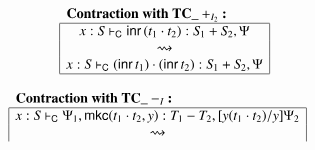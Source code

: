 \documentclass{lmcs}
\newcommand{\DualLNLLogicnt}[1]{\mathit{#1}}
\newcommand{\DualLNLLogicmv}[1]{\mathit{#1}}
\newcommand{\DualLNLLogicsym}[1]{#1}
\newcommand{\DualLNLLogicdrulename}[1]{\textsc{#1}}
\newcommand{\DualLNLLogicdruleTCXXdITwoName}[0]{\DualLNLLogicdrulename{TC\_dI2}}
\newcommand{\DualLNLLogicdruleTCXXsubIName}[0]{\DualLNLLogicdrulename{TC\_subI}}
\renewcommand{\DualLNLLogicdrulename}[1]{#1}
\renewcommand{\DualLNLLogicdruleTCXXdITwoName}{\text{TC\_}+_{I_2}}
\renewcommand{\DualLNLLogicdruleTCXXsubIName}{\text{TC\_}-_I}
\begin{document}
\begin{figure}
\begin{mdframed}
\begin{center}
\begin{math}
\begin{array}{c}
\begin{array}{cc}
\begin{array}{|c|}
        \hline
        \end{array}
        &
        \begin{array}{|c|}
        \multicolumn{1}{l}{\textbf{\textbf{Contraction with $\DualLNLLogicdruleTCXXdITwoName{}$}:}}\\
        \hline
         \DualLNLLogicmv{x}  :  \DualLNLLogicnt{S}  \vdash_{\mathsf{C} }   \mathsf{inr}\, \DualLNLLogicsym{(}   \DualLNLLogicnt{t_{{\mathrm{1}}}}  \cdot  \DualLNLLogicnt{t_{{\mathrm{2}}}}   \DualLNLLogicsym{)}   \DualLNLLogicsym{:}   \DualLNLLogicnt{S_{{\mathrm{1}}}}  +  \DualLNLLogicnt{S_{{\mathrm{2}}}}   \DualLNLLogicsym{,}  \Psi \\
        \rightsquigarrow\\
         \DualLNLLogicmv{x}  :  \DualLNLLogicnt{S}  \vdash_{\mathsf{C} }   \DualLNLLogicsym{(}   \mathsf{inr}\, \DualLNLLogicnt{t_{{\mathrm{1}}}}   \DualLNLLogicsym{)}  \cdot  \DualLNLLogicsym{(}   \mathsf{inr}\, \DualLNLLogicnt{t_{{\mathrm{2}}}}   \DualLNLLogicsym{)}   \DualLNLLogicsym{:}   \DualLNLLogicnt{S_{{\mathrm{1}}}}  +  \DualLNLLogicnt{S_{{\mathrm{2}}}}   \DualLNLLogicsym{,}  \Psi \\
        \hline
      \end{array}
      \end{array}\\
      \\
      \begin{array}{|c|}
        \multicolumn{1}{l}{\textbf{\textbf{Contraction with $\DualLNLLogicdruleTCXXsubIName{}$}:}}\\
        \hline
         \DualLNLLogicmv{x}  :  \DualLNLLogicnt{S}  \vdash_{\mathsf{C} }  \Psi_{{\mathrm{1}}}  \DualLNLLogicsym{,}   \mathsf{mkc}(  \DualLNLLogicnt{t_{{\mathrm{1}}}}  \cdot  \DualLNLLogicnt{t_{{\mathrm{2}}}}  , \DualLNLLogicmv{y} )   \DualLNLLogicsym{:}   \DualLNLLogicnt{T_{{\mathrm{1}}}}  -  \DualLNLLogicnt{T_{{\mathrm{2}}}}   \DualLNLLogicsym{,}  \DualLNLLogicsym{[}  \DualLNLLogicmv{y}  \DualLNLLogicsym{(}   \DualLNLLogicnt{t_{{\mathrm{1}}}}  \cdot  \DualLNLLogicnt{t_{{\mathrm{2}}}}   \DualLNLLogicsym{)}  \DualLNLLogicsym{/}  \DualLNLLogicmv{y}  \DualLNLLogicsym{]}  \Psi_{{\mathrm{2}}} \\
        \rightsquigarrow\\

\end{array}
\end{array}
\end{math}
\end{center}
\end{mdframed}
\end{figure}
\end{document}
